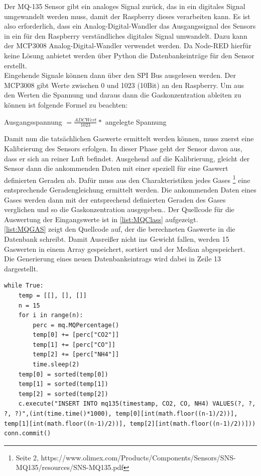 Der MQ-135 Sensor gibt ein analoges Signal zurück, das in ein digitales Signal umgewandelt werden muss, damit der Raspberry dieses verarbeiten kann. Es ist also erforderlich, dass ein Analog-Digital-Wandler das Ausgangssignal des Sensors in ein für den Raspberry verständliches digitales Signal umwandelt. Dazu kann der MCP3008 Analog-Digital-Wandler verwendet werden. Da Node-RED hierfür keine Lösung anbietet werden über Python die Datenbankeinträge für den Sensor erstellt.
\\Eingehende Signale können dann über den \acf{SPI} Bus ausgelesen werden. Der MCP3008 gibt Werte zwischen 0 und 1023 (10Bit) an den Raspberry. Um aus den Werten die Spannung und daraus dann die Gaskonzentration ableiten zu können ist folgende Formel zu beachten\cite{gas:MQX}:\\
\begin{center} Ausgangsspannung $=  \frac{ADC Wert}{1023} *  $ angelegte Spannung\end{center}

Damit nun die tatsächlichen Gaswerte ermittelt werden können, muss zuerst eine Kalibrierung des Sensors erfolgen. In dieser Phase geht der Sensor davon aus, dass er sich an reiner Luft befindet. Ausgehend auf die Kalibrierung, gleicht der Sensor dann die ankommenden Daten mit einer speziell für eine Gaswert definierten Geraden ab. Dafür muss aus den Charakteristiken jedes Gases \footnote{Seite 2, https://www.olimex.com/Products/Components/Sensors/SNS-MQ135/resources/SNS-MQ135.pdf} eine entsprechende Geradengleichung ermittelt werden. Die ankommenden Daten eines Gases werden dann mit der entsprechend definierten Geraden des Gases verglichen und so die Gaskonzentration ausgegeben.\cite{gas:MQ}. Der Quellcode für die Auswertung der Eingangswerte ist in \autoref{list:MQClass} aufgezeigt.
\\ \autoref{list:MQGAS} zeigt den Quellcode auf, der die berechneten Gaswerte in die Datenbank schreibt. Damit Ausreißer nicht ins Gewicht fallen, werden 15 Gaswerten in einem Array gespeichert, sortiert und der Median abgespeichert. Die Generierung eines neuen Datenbankeintrags wird dabei in Zeile 13 dargestellt. 

\begin{lstlisting}[label=list:MQGas, caption={MQ-135 Sensorwerte in DB}]
while True:
	temp = [[], [], []]
	n = 15
	for i in range(n):
		perc = mq.MQPercentage()
		temp[0] += [perc["CO2"]]
		temp[1] += [perc["CO"]]
		temp[2] += [perc["NH4"]]
		time.sleep(2)
	temp[0] = sorted(temp[0])
	temp[1] = sorted(temp[1])
	temp[2] = sorted(temp[2])
	c.execute("INSERT INTO mq135(timestamp, CO2, CO, NH4) VALUES(?, ?, ?, ?)",(int(time.time()*1000), temp[0][int(math.floor((n-1)/2))], temp[1][int(math.floor((n-1)/2))], temp[2][int(math.floor((n-1)/2))]))
conn.commit()
\end{lstlisting}


